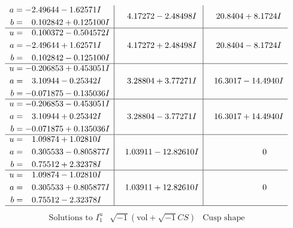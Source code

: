 \documentclass[1p]{elsarticle_modified}
\theoremstyle{definition}
\newcommand{\I}{\sqrt{-1}}
\begin{document}
$$\begin{array}{c|c|c}
\begin{aligned}
a &= -2.49644 - 1.62571 I \\
b &= \phantom{-}0.102842 + 0.125100 I\end{aligned}
 & \phantom{-}4.17272 - 2.48498 I & \phantom{-}20.8404 + 8.1724 I \\ \hline\begin{aligned}
u &= \phantom{-}0.100372 - 0.504572 I \\
a &= -2.49644 + 1.62571 I \\
b &= \phantom{-}0.102842 - 0.125100 I\end{aligned}
 & \phantom{-}4.17272 + 2.48498 I & \phantom{-}20.8404 - 8.1724 I \\ \hline\begin{aligned}
u &= -0.206853 + 0.453051 I \\
a &= \phantom{-}3.10944 - 0.25342 I \\
b &= -0.071875 - 0.135036 I\end{aligned}
 & \phantom{-}3.28804 + 3.77271 I & \phantom{-}16.3017 - 14.4940 I \\ \hline\begin{aligned}
u &= -0.206853 - 0.453051 I \\
a &= \phantom{-}3.10944 + 0.25342 I \\
b &= -0.071875 + 0.135036 I\end{aligned}
 & \phantom{-}3.28804 - 3.77271 I & \phantom{-}16.3017 + 14.4940 I \\ \hline\begin{aligned}
u &= \phantom{-}1.09874 + 1.02810 I \\
a &= \phantom{-}0.305533 - 0.805877 I \\
b &= \phantom{-}0.75512 + 2.32378 I\end{aligned}
 & \phantom{-}1.03911 - 12.82610 I & \phantom{-0.000000 } 0 \\ \hline\begin{aligned}
u &= \phantom{-}1.09874 - 1.02810 I \\
a &= \phantom{-}0.305533 + 0.805877 I \\
b &= \phantom{-}0.75512 - 2.32378 I\end{aligned}
 & \phantom{-}1.03911 + 12.82610 I & \phantom{-0.000000 } 0\\
 \hline 
 \end{array}$$\newpage$$\begin{array}{c|c|c}  
\text{Solutions to }I^u_{1}& \I (\text{vol} + \sqrt{-1}CS) & \text{Cusp shape}\\
 \hline 
\begin{aligned}

\end{aligned}
\end{array}$$
\end{document}
